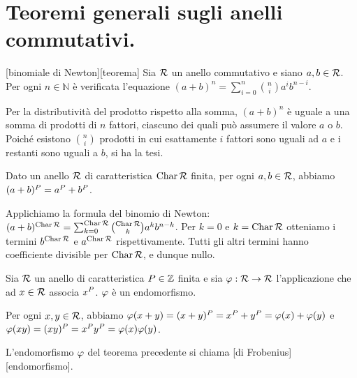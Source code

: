 \section{Teoremi generali sugli anelli commutativi.}\label{TeoremiCommutativi}
\begin{Theorem}
[binomiale di Newton][teorema]
	Sia $\mathcal{R}$ un anello commutativo e siano $a,b \in \mathcal{R}$.
	Per ogni $n \in \mathbb{N}$ \`e verificata l'equazione
	$(a + b)^n = \sum_{i = 0}^n \binom{n}{i} a^ib^{n - i}$.
\end{Theorem}
\Proof
Per la distributivit\`a del prodotto rispetto alla somma,
$(a + b)^n$ \`e uguale a una somma di prodotti di $n$ fattori,
ciascuno dei quali pu\`o assumere il valore $a$ o $b$.
Poich\'e esistono $\binom{n}{i}$ prodotti
in cui esattamente $i$ fattori sono uguali ad $a$ e
i restanti sono uguali a $b$, si ha la tesi.
\EndProof
\begin{Theorem}
	Dato un anello $\mathcal{R}$ di caratteristica
	$\operatorname{Char}{\mathcal{R}}$ finita,
	per ogni $a, b \in \mathcal{R}$,
	abbiamo $(a + b)^P = a^P + b^P$.
\end{Theorem}
\Proof
Applichiamo la formula del binomio di Newton:
$(a + b)^{\operatorname{Char}{\mathcal{R}}} =
\sum_{k = 0}^{\operatorname{Char}{\mathcal{R}}}
\binom{\operatorname{Char}{\mathcal{R}}}{k} a^kb^{n - k}$.
Per $k = 0$ e $k = \operatorname{Char}{\mathcal{R}}$ otteniamo i termini
$b^{\operatorname{Char}{\mathcal{R}}}$ e $a^{\operatorname{Char}{\mathcal{R}}}$ rispettivamente.
Tutti gli altri termini hanno coefficiente divisible per
$\operatorname{Char}{\mathcal{R}}$, e dunque nullo.
\EndProof
\begin{Theorem}
	Sia $\mathcal{R}$ un anello di caratteristica $P \in \mathbb{Z}$ finita e
	sia $\varphi: \mathcal{R} \rightarrow \mathcal{R}$ l'applicazione che ad
	$x \in \mathcal{R}$ associa $x^{P}$.
	$\varphi$ \`e un endomorfismo.
\end{Theorem}
\Proof
Per ogni $x,y \in \mathcal{R}$, abbiamo
$\varphi(x + y) =
(x + y)^{P} =
x^P + y^P =
\varphi(x) + \varphi(y)$ e
$\varphi(xy) =
(xy)^P =
x^P y^P =
\varphi(x)\varphi(y)$.
\EndProof
\begin{Definition}
	L'endomorfismo $\varphi$ del teorema precedente si chiama
	[di Frobenius][endomorfismo].
\end{Definition}
